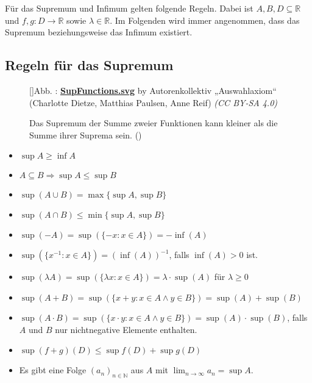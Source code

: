 \documentclass[fontsize=9pt,
               parskip=half-,
               DIV=14,
               listof=chapterentry,
               tocflat]{scrbook}
\newcounter{imagelabel}
\begin{document}
Für das Supremum und Infimum gelten folgende Regeln. Dabei ist $A,B,D\subseteq \mathbb {R} $ und $f,g:D\rightarrow \mathbb {R} $ sowie $\lambda \in \mathbb {R} $. Im Folgenden wird immer angenommen, dass das Supremum beziehungsweise das Infimum existiert.

\subsection{Regeln für das Supremum}

\begin{figure}[h]
\vspace{\baselineskip}
[]{Abb. : \protect\href{https://commons.wikimedia.org/wiki/File:SupFunctions.svg}{\textbf{SupFunctions.svg}} by Autorenkollektiv „Auswahlaxiom“ (Charlotte Dietze, Matthias Paulsen, Anne Reif) \textit{(CC BY-SA 4.0)}}\centering
{}
\caption*{Das Supremum der Summe zweier Funktionen kann kleiner als die Summe ihrer Suprema sein. ()}
\end{figure}
\begin{itemize}
\item $\sup A\geq \inf A$
\item $A\subseteq B\Rightarrow \sup A\leq \sup B$
\end{itemize}

\begin{itemize}
\item $\sup(A\cup B)=\max\{\sup A,\sup B\}$
\item $\sup(A\cap B)\leq \min\{\sup A,\sup B\}$
\item $\sup(-A)=\sup(\{-x:x\in A\})=-\inf(A)$
\item $\sup(\{x^{-1}:x\in A\})=(\inf(A))^{-1}$, falls $\inf(A)>0$ ist.
\item $\sup(\lambda A)=\sup(\{\lambda x:x\in A\})=\lambda \cdot \sup(A)$ für $\lambda \geq 0$
\item $\sup(A+B)=\sup(\{x+y:x\in A\land y\in B\})=\sup(A)+\sup(B)$
\item $\sup(A\cdot B)=\sup(\{x\cdot y:x\in A\land y\in B\})=\sup(A)\cdot \sup(B)$, falls $A$ und $B$ nur nichtnegative Elemente enthalten.
\item $\sup(f+g)(D)\leq \sup f(D)+\sup g(D)$
\item Es gibt eine Folge $(a_{n})_{n\in \mathbb {N} }$ aus $A$ mit $\lim _{n\rightarrow \infty }a_{n}=\sup A$.
\end{itemize}
\end{document}

